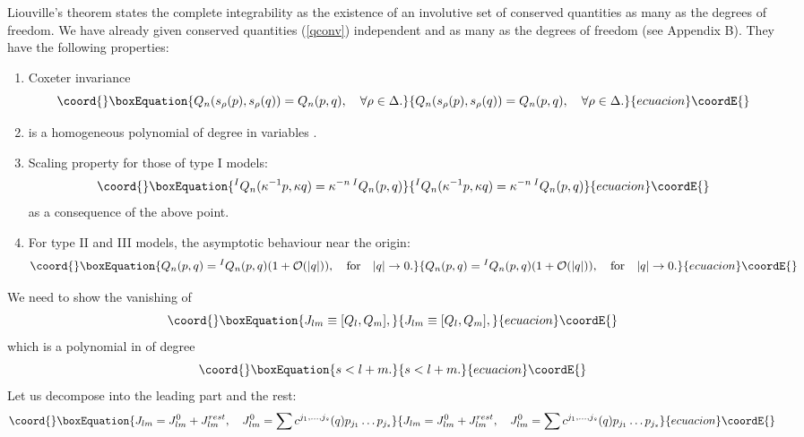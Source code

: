\documentclass[a4paper,12pt]{article}
\begin{document}
Liouville's theorem states the complete integrability as the existence of an
involutive set of conserved quantities as many as the degrees of freedom.
We have already given conserved quantities \coordHE{} (\ref{qconv})
independent and as many as the degrees of freedom (see Appendix B).
They have the following properties:
\begin{enumerate}
\item
Coxeter invariance
\begin{equation}\coord{}\boxEquation{
    Q_n(s_{\rho}(p),s_{\rho}(q))=Q_n(p,q),\quad \forall\rho\in\Delta.
}{
    Q_n(s_{\rho}(p),s_{\rho}(q))=Q_n(p,q),\quad \forall\rho\in\Delta.
}{ecuacion}\coordE{}\end{equation}
\item
{}\coordHE{} is a homogeneous polynomial of degree \coordHE{} in variables
\coordHE{}.
\item
Scaling property for those of type I models:
\begin{equation}\coord{}\boxEquation{
   {}^IQ_n(\kappa^{-1}p,\kappa q)=\kappa^{-n}\,{}^IQ_n(p,q)
}{
   {}^IQ_n(\kappa^{-1}p,\kappa q)=\kappa^{-n}\,{}^IQ_n(p,q)
}{ecuacion}\coordE{}\end{equation}
as a consequence of the above point.
\item
For type II and III models, the asymptotic behaviour near the origin:
\begin{equation}\coord{}\boxEquation{
   Q_n(p,q)={}^IQ_n(p,q)(1+{\cal O}(|q|)),\quad \mbox{for}\quad |q|\to0.
}{
   Q_n(p,q)={}^IQ_n(p,q)(1+{\cal O}(|q|)),\quad \mbox{for}\quad |q|\to0.
}{ecuacion}\coordE{}\end{equation}
\end{enumerate}
We need to show the vanishing of
\begin{equation}\coord{}\boxEquation{
J_{lm}\equiv [Q_l,Q_m],
}{
J_{lm}\equiv [Q_l,Q_m],
}{ecuacion}\coordE{}\end{equation}
which is a polynomial in \coordHE{} of degree \coordHE{}
\begin{equation}\coord{}\boxEquation{
   s<l+m.
   \label{slesslm}
}{
   s<l+m.
   }{ecuacion}\coordE{}\end{equation}
Let us decompose \coordHE{} into the leading part and the rest:
\begin{equation}\coord{}\boxEquation{
   J_{lm}=J_{lm}^0+J_{lm}^{rest},\quad
   J_{lm}^0=\sum c^{j_1,\ldots,j_s}(q)p_{j_1}\ldots p_{j_s}
}{
   J_{lm}=J_{lm}^0+J_{lm}^{rest},\quad
   J_{lm}^0=\sum c^{j_1,\ldots,j_s}(q)p_{j_1}\ldots p_{j_s}
}{ecuacion}\coordE{}\end{equation}
\end{document}
